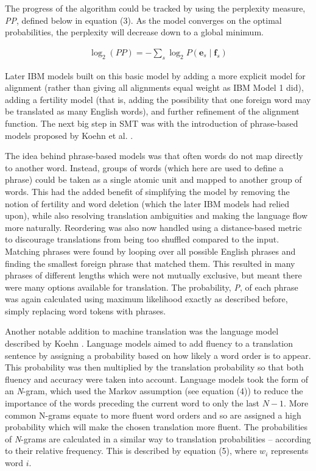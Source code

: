 \documentclass[11pt]{article}
\begin{document}
The progress of the algorithm could be tracked by using the perplexity measure, \textit{PP}, defined below in equation (3). As the model converges on the optimal probabilities, the perplexity will decrease down to a global minimum.

\begin{align}
    \log_2(PP) = - \sum_s \log_2 P( \textbf{e}_s \mid \textbf{f}_s )
    \label{perplexity}
\end{align}

Later IBM models built on this basic model by adding a more explicit model for alignment (rather than giving all alignments equal weight as IBM Model 1 did), adding a fertility model (that is, adding the possibility that one foreign word may be translated as many English words), and further refinement of the alignment function. The next big step in SMT was with the introduction of phrase-based models proposed by Koehn et al. \citeyearpar{koehn-etal-2003-statistical}.

\bigskip

The idea behind phrase-based models was that often words do not map directly to another word. Instead, groups of words (which here are used to define a phrase) could be taken as a single atomic unit and mapped to another group of words. This had the added benefit of simplifying the model by removing the notion of fertility and word deletion (which the later IBM models had relied upon), while also resolving translation ambiguities and making the language flow more naturally. Reordering was also now handled using a distance-based metric to discourage translations from being too shuffled compared to the input. Matching phrases were found by looping over all possible English phrases and finding the smallest foreign phrase that matched them. This resulted in many phrases of different lengths which were not mutually exclusive, but meant there were many options available for translation. The probability, \textit{P}, of each phrase was again calculated using maximum likelihood exactly as described before, simply replacing word tokens with phrases.

\bigskip

Another notable addition to machine translation was the language model described by Koehn \citeyearpar[ch. 7]{koehn2010}. Language models aimed to add fluency to a translation sentence by assigning a probability based on how likely a word order is to appear. This probability was then multiplied by the translation probability so that both fluency and accuracy were taken into account. Language models took the form of an \textit{N}-gram, which used the Markov assumption (see equation (4)) to reduce the importance of the words preceding the current word to only the last $N-1$. More common N-grams equate to more fluent word orders and so are assigned a high probability which will make the chosen translation more fluent. The probabilities of \textit{N}-grams are calculated in a similar way to translation probabilities -- according to their relative frequency. This is described by equation (5), where $w_i$ represents word $i$.
\end{document}

